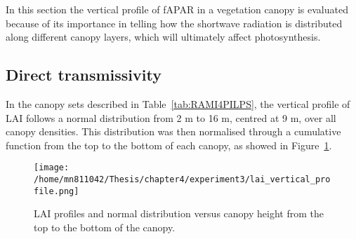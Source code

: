 In this section the vertical profile of fAPAR in a vegetation canopy is evaluated because of its importance in telling how the shortwave radiation is distributed along different canopy layers, which will ultimately affect photosynthesis. 





\subsection{Direct transmissivity}

In the canopy sets described in Table~\ref{tab:RAMI4PILPS}, the vertical profile of LAI follows a normal distribution from 2 m to 16 m, centred at 9 m, over all canopy densities. This distribution was then normalised through a cumulative function from the top to the bottom of each canopy, as showed in Figure~\ref{f:laiprof}.

\begin{figure}[ht!]
\centering
\texttt{[image: /home/mn811042/Thesis/chapter4/experiment3/lai\_vertical\_profile.png]}
\caption{LAI profiles and normal distribution versus canopy height from the top to the bottom of the canopy.}
\label{f:laiprof}
\end{figure}


